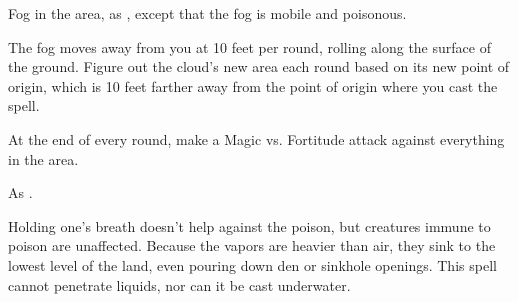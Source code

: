 \begin{spellheader}
\end{spellheader}
\begin{spellcontent}
    \begin{spelltargetinginfo}
    \end{spelltargetinginfo}
    \begin{spelleffects}
        \spelleffect Fog in the area, as , except that the fog is mobile and poisonous.

        \par The fog moves away from you at 10 feet per round, rolling along the surface of the ground. Figure out the cloud's new area each round based on its new point of origin, which is 10 feet farther away from the point of origin where you cast the spell.
        \begin{spelltriggeredattack}{At the end of every round, make a Magic vs. Fortitude attack against everything in the area.}
        \end{spelltriggeredattack}
    \end{spelleffects}
\end{spellcontent}
\begin{spellfooter}
    \spellnotes As .

    Holding one's breath doesn't help against the poison, but creatures immune to poison are unaffected. Because the vapors are heavier than air, they sink to the lowest level of the land, even pouring down den or sinkhole openings. This spell cannot penetrate liquids, nor can it be cast underwater.
\end{spellfooter}

